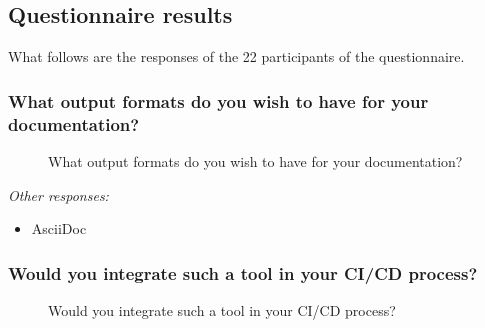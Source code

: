 \subsection{Questionnaire results}

What follows are the responses of the 22 participants of the questionnaire.

\subsubsection*{What output formats do you wish to have for your documentation?}

\begin{figure}[H]
    \centering
    \label{fig:qOutputFormats}
    \caption{What output formats do you wish to have for your documentation?}
\end{figure}

\textit{Other responses:}
\begin{itemize}
    \item AsciiDoc
\end{itemize}

\subsubsection*{Would you integrate such a tool in your CI/CD process?}

\begin{figure}[H]
    \centering
    \caption{Would you integrate such a tool in your CI/CD process?}
\end{figure}

